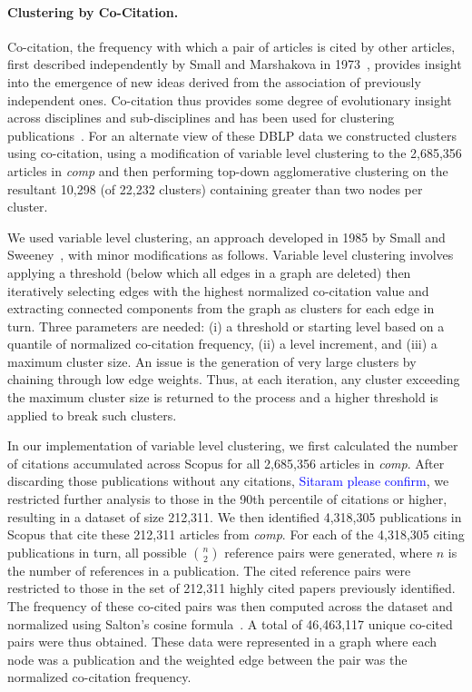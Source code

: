 \paragraph{Clustering by Co-Citation.}
Co-citation, the frequency with which a pair of articles is cited by other articles,  first described independently by Small and Marshakova in 1973~\cite{small_co-citation_1973,marshakova-shaikevich_co-citation_1973},
provides insight into the emergence of new ideas derived from the association of previously independent ones. 
Co-citation thus provides some degree of evolutionary insight across disciplines and sub-disciplines and has been used for clustering publications~\cite{boyack_cocitation_2010,boyack_improving_2013,small_structure_1974,small_clustering_1985}. 
For an alternate view of these DBLP data we constructed clusters using co-citation, using a modification of   variable level clustering to the 2,685,356 articles in \emph{comp} and then performing top-down agglomerative clustering on the resultant 10,298 (of 22,232 clusters) containing greater than two nodes per cluster.  

We used variable level clustering, an approach developed in 1985 by Small and Sweeney~\cite{small_clustering_1985}, with minor modifications as follows. Variable level clustering involves applying a threshold (below which all edges in a graph are deleted) then iteratively selecting edges with the highest normalized co-citation value and extracting connected components from the graph as clusters for each edge in turn. Three parameters are needed: (i) a threshold or starting level based on a quantile of normalized co-citation frequency, (ii) a level increment, and (iii) a maximum cluster size. An issue is the generation of very large clusters by chaining through low edge weights.  Thus, at each iteration, any cluster exceeding the maximum cluster size  is returned to the process and a higher threshold is applied to break such clusters.

In our implementation of variable level clustering, we first calculated the number of citations accumulated across Scopus for all 2,685,356 articles in \emph{comp}. After discarding those publications without any citations, \textcolor{blue}{Sitaram please confirm}, we restricted further analysis to those in the 90th percentile of citations or higher, resulting in a dataset of size 212,311. We then identified 4,318,305 publications in Scopus that cite these 212,311 articles from \emph{comp}. For each of the 4,318,305 citing publications in turn, all possible ${n \choose 2}$ reference pairs were generated, where $n$ is the number of references in a publication. The cited reference pairs were restricted to those in the set of 212,311 highly cited papers previously identified. The frequency of these co-cited pairs was then computed across the dataset  and normalized using Salton's cosine formula~\cite{salton_citation_1979}. A total of 46,463,117 unique co-cited pairs were thus obtained. These data were represented in a graph where each node was a publication and the weighted edge between the pair was the normalized co-citation frequency. \par

